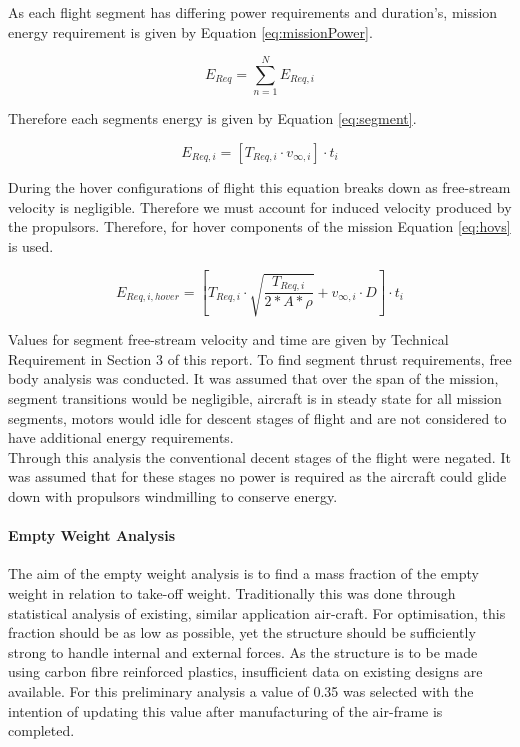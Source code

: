 As each flight segment has differing power requirements and duration's, mission energy requirement is given by Equation \ref{eq:missionPower}. 

\begin{equation}
    E_{Req} = \sum_{n=1}^{N} E_{Req, i}
    \label{eq:missionPower}
\end{equation}

Therefore each segments energy is given by Equation \ref{eq:segment}. 

\begin{equation}
    E_{Req, i} = \left[T_{Req, i} \cdot v_{\infty, i}\right] \cdot t_i
    \label{eq:segment}
\end{equation}

During the hover configurations of flight this equation breaks down as free-stream velocity is negligible. Therefore we must account for induced velocity produced by the propulsors. Therefore, for hover components of the mission Equation \ref{eq:hovs} is used.

\begin{equation}
    E_{Req, i, hover} = \left[T_{Req, i} \cdot \sqrt{\dfrac{T_{Req, i}}{2*A*\rho}} + v_{\infty, i}\cdot D\right] \cdot t_i
    \label{eq:hovs}
\end{equation}



Values for segment free-stream velocity and time are given by Technical Requirement in Section 3 of this report. To find segment thrust requirements, free body analysis was conducted. It was assumed that over the span of the mission, segment transitions would be negligible, aircraft is in steady state for all mission segments, motors would idle for descent stages of flight and are not considered to have additional energy requirements.\\

Through this analysis the conventional decent stages of the flight were negated. It was assumed that for these stages no power is required as the aircraft could glide down with propulsors windmilling to conserve energy.



\paragraph{Empty Weight Analysis}
The aim of the empty weight analysis is to find a mass fraction of the empty weight in relation to take-off weight. Traditionally this was done through statistical analysis of existing, similar application air-craft. For optimisation, this fraction should be as low as possible, yet the structure should be sufficiently strong to handle internal and external forces. As the structure is to be made using carbon fibre reinforced plastics, insufficient data on existing designs are available. For this preliminary analysis a value of 0.35 was selected with the intention of updating this value after manufacturing of the air-frame is completed.

